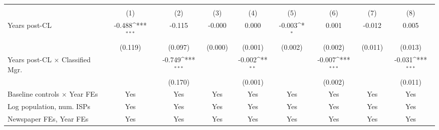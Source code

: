 {
\def\sym#1{\ifmmode^{#1}\else\(^{#1}\)\fi}
\begin{tabular}{l*{8}{c}}
\toprule
                    &&&&\\\cmidrule(lr){2-3}\cmidrule(lr){4-5}\cmidrule(lr){6-7}\cmidrule(lr){8-9}
                    &         &         &         &         &         &         &         &         \\
\midrule
Years post-CL       &      -0.488\sym{***}&      -0.115         &      -0.000         &       0.000         &      -0.003\sym{*}  &       0.001         &      -0.012         &       0.005         \\
                    &     (0.119)         &     (0.097)         &     (0.000)         &     (0.001)         &     (0.002)         &     (0.002)         &     (0.011)         &     (0.013)         \\
\addlinespace
Years post-CL $\times$ Classified Mgr.&                     &      -0.749\sym{***}&                     &      -0.002\sym{**} &                     &      -0.007\sym{***}&                     &      -0.031\sym{***}\\
                    &                     &     (0.170)         &                     &     (0.001)         &                     &     (0.002)         &                     &     (0.011)         \\
\addlinespace
Baseline controls $\times$ Year FEs &         Yes         &         Yes         &         Yes         &         Yes         &         Yes         &         Yes         &         Yes         &         Yes         \\
\addlinespace
Log population, num. ISPs &         Yes         &         Yes         &         Yes         &         Yes         &         Yes         &         Yes         &         Yes         &         Yes         \\
\addlinespace
Newspaper FEs, Year FEs &         Yes         &         Yes         &         Yes         &         Yes         &         Yes         &         Yes         &         Yes         &         Yes         \\

\end{tabular}}
